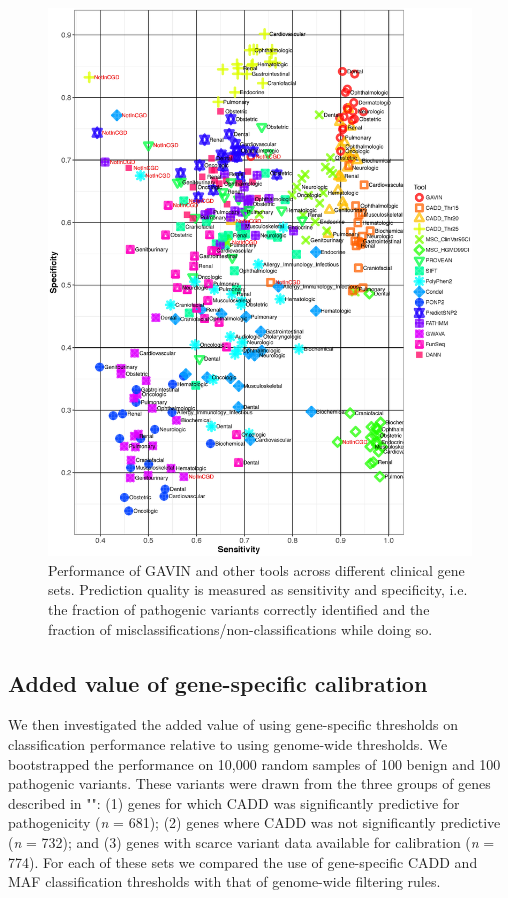 \begin{figure}
	\includegraphics[width=1.0\linewidth]{img/gavin_performance}
	\caption[Performance of GAVIN and other tools]{Performance of GAVIN and other tools across different clinical gene sets. Prediction quality is measured as sensitivity and specificity, i.e. the fraction of pathogenic variants correctly identified and the fraction of misclassifications/non-classifications while doing so.}
	\label{fig:gavin_performance}
\end{figure}


\subsection{Added value of gene-specific calibration}
We then investigated the added value of using gene-specific thresholds on classification performance relative to using genome-wide thresholds.
We bootstrapped the performance on 10,000 random samples of 100 benign and 100 pathogenic variants.
These variants were drawn from the three groups of genes described in "": (1) genes for which CADD was significantly predictive for pathogenicity (\textsl{n} = 681); (2) genes where CADD was not significantly predictive (\textsl{n} = 732); and (3) genes with scarce variant data available for calibration (\textsl{n} = 774).
For each of these sets we compared the use of gene-specific CADD and MAF classification thresholds with that of genome-wide filtering rules.

